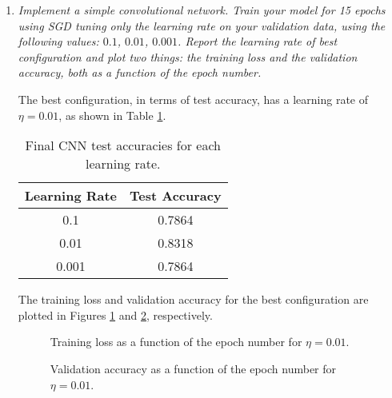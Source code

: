 \documentclass[12pt]{article}
\begin{document}
\begin{enumerate}[leftmargin=\labelsep]

    \item \textit{Implement a simple convolutional network. Train your model for 15 epochs using SGD tuning only the learning rate on your validation data, using the following values: $0.1$, $0.01$, $0.001$. Report the learning rate of best configuration and plot two things: the training loss and the validation accuracy, both as a function of the epoch number.}

          \vspace{12pt}

          The best configuration, in terms of test accuracy, has a learning rate of $\eta = 0.01$, as shown in Table \ref{tab:cnn-pool-test-acc}.

          \begin{table}[H]
              \centering
              \begin{tabular}{|c|c|}
                  \hline
                  \textbf{Learning Rate} & \textbf{Test Accuracy} \\ \hline
                  0.1                    & 0.7864                 \\ \hline
                  0.01                   & 0.8318                 \\ \hline
                  0.001                  & 0.7864                 \\ \hline
              \end{tabular}
              \caption{Final CNN test accuracies for each learning rate.}
              \label{tab:cnn-pool-test-acc}
          \end{table}

          The training loss and validation accuracy for the best configuration are plotted in Figures \ref{fig:cnn-training-loss-0.01-0.7-0-sgd-false} and \ref{fig:cnn-validation-accuracy-0.01-0.7-0-sgd-false}, respectively.

          \begin{figure}[H]
              \centering
              
              \caption{Training loss as a function of the epoch number for $\eta = 0.01$.}
              \label{fig:cnn-training-loss-0.01-0.7-0-sgd-false}
          \end{figure}

          \begin{figure}[H]
              \centering
              
              \caption{Validation accuracy as a function of the epoch number for $\eta = 0.01$.}
              \label{fig:cnn-validation-accuracy-0.01-0.7-0-sgd-false}
          \end{figure}


\end{enumerate}
\end{document}
